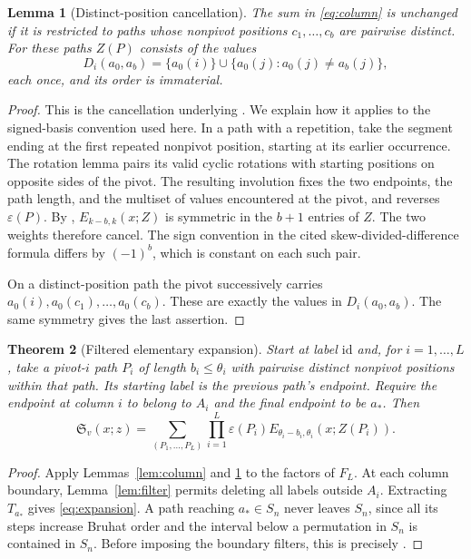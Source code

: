 \documentclass{amsart}
\newtheorem{theorem}{Theorem}[section]
\newtheorem{lemma}[theorem]{Lemma}
\theoremstyle{definition}
\theoremstyle{remark}
\numberwithin{equation}{section}
\newcommand{\Sch}{\mathfrak S}
\newcommand{\id}{\mathrm{id}}
\begin{document}
\begin{lemma}[Distinct-position cancellation]\label{lem:cancellation}
The sum in \eqref{eq:column} is unchanged if it is restricted to paths
whose nonpivot positions $c_1,\ldots,c_b$ are pairwise distinct.
For these paths $Z(P)$ consists of the values
\[
 D_i(a_0,a_b)=\{a_0(i)\}\cup
              \{a_0(j):a_0(j)\ne a_b(j)\},
\]
each once, and its order is immaterial.
\end{lemma}
\begin{proof}
This is the cancellation underlying
\cite[Lemma~7.5 and Theorem~7.6]{samuelquantum}.
We explain how it applies to the signed-basis convention used here.
In a path with a repetition, take the segment ending at the first
repeated nonpivot position, starting at its earlier occurrence.
The rotation lemma pairs its valid cyclic rotations with starting
positions on opposite sides of the pivot.
The resulting involution fixes the two endpoints, the path length,
and the multiset of values encountered at the pivot, and reverses
$\varepsilon(P)$.
By \cite[Lemma~7.3]{samuelquantum},
$E_{k-b,k}(x;Z)$ is symmetric in the $b+1$ entries of $Z$.
The two weights therefore cancel.
The sign convention in the cited skew-divided-difference formula
differs by $(-1)^b$, which is constant on each such pair.

On a distinct-position path the pivot successively carries
$a_0(i),a_0(c_1),\ldots,a_0(c_b)$.
These are exactly the values in $D_i(a_0,a_b)$.
The same symmetry gives the last assertion.
\end{proof}

\begin{theorem}[Filtered elementary expansion]\label{thm:elementary}
Start at label $\id$ and, for $i=1,\ldots,L$, take a pivot-$i$
path $P_i$ of length $b_i\leq\theta_i$ with pairwise distinct
nonpivot positions within that path.
Its starting label is the previous path's endpoint.
Require the endpoint at column $i$ to belong to $A_i$ and the final
endpoint to be $a_*$.
Then
\begin{equation}\label{eq:expansion}
 \Sch_v(x;z)=
 \sum_{(P_1,\ldots,P_L)}
 \prod_{i=1}^L
   \varepsilon(P_i)E_{\theta_i-b_i,\theta_i}(x;Z(P_i)).
\end{equation}
\end{theorem}
\begin{proof}
Apply Lemmas~\ref{lem:column} and \ref{lem:cancellation}
to the factors of $F_L$.
At each column boundary, Lemma~\ref{lem:filter} permits deleting all
labels outside $A_i$.
Extracting $T_{a_*}$ gives \eqref{eq:expansion}.
A path reaching $a_*\in S_n$ never leaves $S_n$, since all its
steps increase Bruhat order and the interval below a permutation in
$S_n$ is contained in $S_n$.
Before imposing the boundary filters, this is precisely
\cite[Theorem~4.5]{samuelquantum}.
\end{proof}
\end{document}
